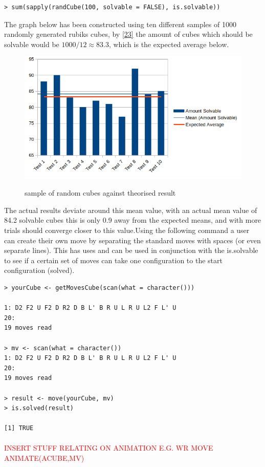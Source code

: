 \documentclass{article}
\begin{document}
\begin{lstlisting}
> sum(sapply(randCube(100, solvable = FALSE), is.solvable))
\end{lstlisting}

The graph below has been constructed using ten different samples of 1000 randomly generated rubiks cubes, by \ref{23} the amount of cubes which should be solvable would be $1000/12 \approx 83.3$, which is the expected average below.

\begin{figure}
\includegraphics[scale=.8]{randomcube.png}
\label{fig:randomresult}
\caption{sample of random cubes against theorised result}
\end{figure}

The actual results deviate around this mean value, with an actual mean value of 84.2 solvable cubes this is only 0.9 away from the expected means, and with more trials should converge closer to this value.\newline Using the following command a user can create their own move by separating the standard moves with spaces (or even separate lines). This has uses and can be used in conjunction with the is.solvable to see if a certain set of moves can take one configuration to the start configuration (solved).
\begin{lstlisting}
> yourCube <- getMovesCube(scan(what = character()))

1: D2 F2 U F2 D R2 D B L' B R U L R U L2 F L' U
20:
19 moves read

> mv <- scan(what = character())
1: D2 F2 U F2 D R2 D B L' B R U L R U L2 F L' U
20:
19 moves read

> result <- move(yourCube, mv)
> is.solved(result)

[1] TRUE
\end{lstlisting}
\paragraph*{}
\textcolor{red}{INSERT STUFF RELATING ON ANIMATION E.G. WR MOVE ANIMATE(ACUBE,MV)}
\end{document}
